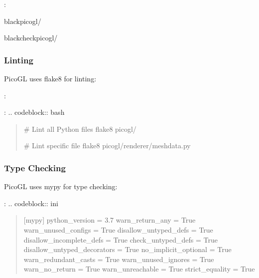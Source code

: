 \documentclass[a4paper,10pt,english,openany,oneside]{sphinxmanual}
\begin{document}
\sphinxAtStartPar
{}:

\begin{sphinxVerbatim}[commandchars=\\\{\}]
blackpicogl/

black\PYGZhy{}\PYGZhy{}checkpicogl/
\end{sphinxVerbatim}


\subsubsection{Linting}
\label{\detokenize{development:linting}}
\sphinxAtStartPar
PicoGL uses flake8 for linting:

\sphinxAtStartPar
{}:

\begin{sphinxVerbatim}[commandchars=\\\{\}]
\end{sphinxVerbatim}

\sphinxAtStartPar
{}:
.. code\sphinxhyphen{}block:: bash
\begin{quote}

\sphinxAtStartPar
\# Lint all Python files
flake8 picogl/

\sphinxAtStartPar
\# Lint specific file
flake8 picogl/renderer/meshdata.py
\end{quote}


\subsubsection{Type Checking}
\label{\detokenize{development:type-checking}}
\sphinxAtStartPar
PicoGL uses mypy for type checking:

\sphinxAtStartPar
{}:
.. code\sphinxhyphen{}block:: ini
\begin{quote}

\sphinxAtStartPar
{[}mypy{]}
python\_version = 3.7
warn\_return\_any = True
warn\_unused\_configs = True
disallow\_untyped\_defs = True
disallow\_incomplete\_defs = True
check\_untyped\_defs = True
disallow\_untyped\_decorators = True
no\_implicit\_optional = True
warn\_redundant\_casts = True
warn\_unused\_ignores = True
warn\_no\_return = True
warn\_unreachable = True
strict\_equality = True
\end{quote}
\end{document}
